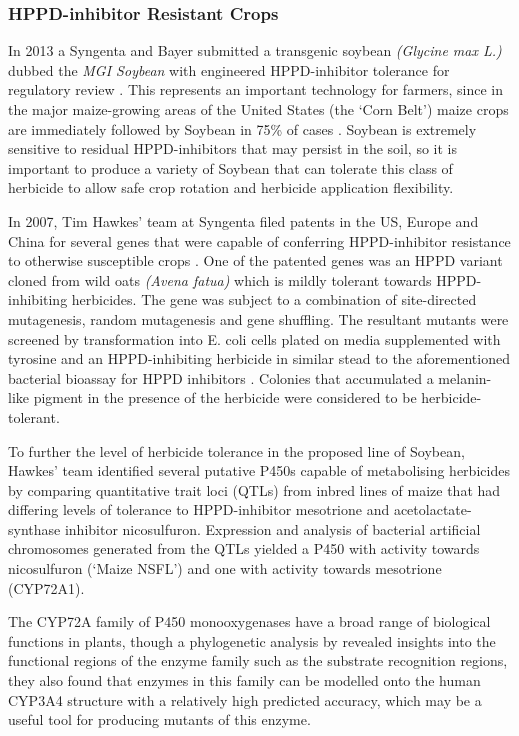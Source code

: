 \documentclass[16pt]{book}
\begin{document}
\subsubsection{HPPD-inhibitor Resistant Crops}
In 2013 a Syngenta and Bayer submitted a transgenic soybean \textit{(Glycine max L.)} dubbed the \textit{MGI Soybean} with engineered HPPD-inhibitor tolerance for regulatory review \cite{syngenra2013mgi}. 
This represents an important technology for farmers, since in the major maize-growing areas of the United States (the ‘Corn Belt’) maize crops are immediately followed by Soybean in 75\% of cases \cite{hawkes2007ep}.
Soybean is extremely sensitive to residual HPPD-inhibitors that may persist in the soil, so it is important to produce a variety of Soybean that can tolerate this class of herbicide to allow safe crop rotation and herbicide application flexibility.


In 2007, Tim Hawkes’ team at Syngenta filed patents in the US, Europe and China for several genes that were capable of conferring HPPD-inhibitor resistance to otherwise susceptible crops \cite{hawkes2007ep}.
One of the patented genes was an HPPD variant cloned from wild oats \textit{(Avena fatua)} which is mildly tolerant towards HPPD-inhibiting herbicides. 
The gene was subject to a combination of site-directed mutagenesis, random mutagenesis and gene shuffling. 
The resultant mutants were screened by transformation into E. 
coli cells plated on media supplemented with tyrosine and an HPPD-inhibiting herbicide in similar stead to the aforementioned bacterial bioassay for HPPD inhibitors  \cite{rocaboy2014novel}. 
Colonies that accumulated a melanin-like pigment in the presence of the herbicide were considered to be herbicide-tolerant.


To further the level of herbicide tolerance in the proposed line of Soybean, Hawkes’ team identified several putative P450s capable of metabolising herbicides by comparing quantitative trait loci (QTLs) from inbred lines of maize that had differing levels of tolerance to HPPD-inhibitor mesotrione and acetolactate-synthase inhibitor nicosulfuron.  
Expression and analysis of bacterial artificial chromosomes generated from the QTLs yielded a P450 with activity towards nicosulfuron (‘Maize NSFL’) and one with activity towards mesotrione (CYP72A1). 



The CYP72A family of P450 monooxygenases have a broad range of biological functions in plants, though a phylogenetic analysis by \cite{prall2016utility} revealed insights into the functional regions of the enzyme family such as the substrate recognition regions, they also found that enzymes in this family can be modelled onto the human CYP3A4 structure with a relatively high predicted accuracy, which may be a useful tool for producing mutants of this enzyme.
 
\end{document}
